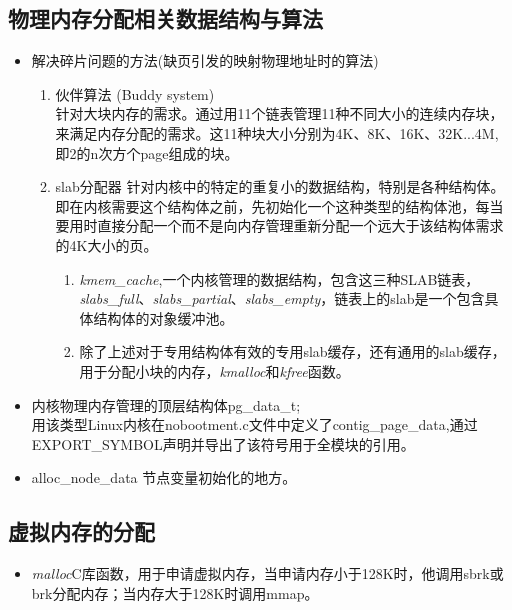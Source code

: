     \subsection{物理内存分配相关数据结构与算法}
    	\begin{itemize}
    		\item 解决碎片问题的方法(缺页引发的映射物理地址时的算法)\\
    			\begin{enumerate}
    				\item 伙伴算法 (Buddy system)\\
    				针对大块内存的需求。通过用11个链表管理11种不同大小的连续内存块，来满足内存分配的需求。这11种块大小分别为4K、8K、16K、32K...4M,即2的n次方个page组成的块。
    				\item slab分配器
    				针对内核中的特定的重复小的数据结构，特别是各种结构体。即在内核需要这个结构体之前，先初始化一个这种类型的结构体池，每当要用时直接分配一个而不是向内存管理重新分配一个远大于该结构体需求的4K大小的页。
    				\begin{enumerate}
    					\item \emph{kmem\_cache},一个内核管理的数据结构，包含这三种SLAB链表，\emph{slabs\_full}、\emph{slabs\_partial}、\emph{slabs\_empty}，链表上的slab是一个包含具体结构体的对象缓冲池。
    					\item 除了上述对于专用结构体有效的专用slab缓存，还有通用的slab缓存，用于分配小块的内存，\emph{kmalloc}和\emph{kfree}函数。
    				\end{enumerate}
    			\end{enumerate}
    		\item 内核物理内存管理的顶层结构体pg\_data\_t;\\
    		用该类型Linux内核在nobootment.c文件中定义了contig\_page\_data,通过EXPORT\_SYMBOL声明并导出了该符号用于全模块的引用。
    		\item alloc\_node\_data 节点变量初始化的地方。
    	\end{itemize}
   	\subsection{虚拟内存的分配}
   		\begin{itemize}
   			\item \emph{malloc}C库函数，用于申请虚拟内存，当申请内存小于128K时，他调用sbrk或brk分配内存；当内存大于128K时调用mmap。
   		\end{itemize}
